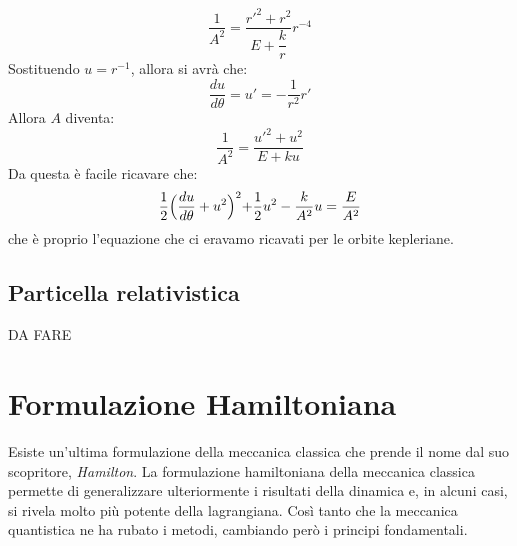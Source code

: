 \documentclass[a4paper,openany]{article}
\begin{document}
\begin{equation}\label{key}
	\dfrac{1}{A^2} = \dfrac{r'^2+r^2}{E+\dfrac{k}{r}}r^{-4}
\end{equation}
Sostituendo $u = r^{-1}$, allora si avrà che:
$$
\dfrac{du}{d\theta}=u'=-\dfrac{1}{r^2}r'
$$
Allora $A$ diventa:
\begin{equation}\label{key}
		\dfrac{1}{A^2}  = \dfrac{u'^2 + u^2}{E+ku}
\end{equation}
Da questa è facile ricavare che:
\begin{equation}\label{key}
	\dfrac{1}{2}\Bigl(\dfrac{du}{d\theta}+u^2\Bigl)^2+\dfrac{1}{2}u^2-\dfrac{k}{A^2}u=\dfrac{E}{A^2}
\end{equation}
che è proprio l'equazione che ci eravamo ricavati per le orbite kepleriane. 
\subsection{Particella relativistica}
	DA FARE
	
	\newpage
	
	\section{Formulazione Hamiltoniana}
	Esiste un'ultima formulazione della meccanica classica che prende il nome dal suo scopritore, \textit{Hamilton}. La formulazione hamiltoniana della meccanica classica permette di generalizzare ulteriormente i risultati della dinamica e, in alcuni casi, si rivela molto più potente della lagrangiana. Così tanto che la meccanica quantistica ne ha rubato i metodi, cambiando però i principi fondamentali.
	
\end{document}
